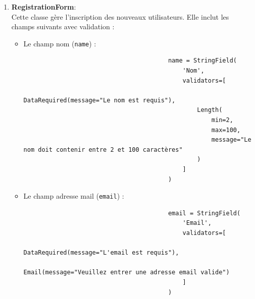 \documentclass[a4paper,11pt]{article}
\begin{document}
                \begin{enumerate}
                    \item \textbf{RegistrationForm}:\\
                        \noindent Cette classe gère l'inscription des nouveaux utilisateurs. Elle inclut les champs suivants avec validation :

                        \begin{itemize}
                            \item Le champ nom (\texttt{name}) :
                                \begin{tcolorbox}[colback=lightgray!6, colframe=black, left=-70mm, right=5mm, top=2mm, bottom=0mm, boxrule=0.1mm]
                                    \begin{verbatim}
                                        name = StringField(
                                            'Nom', 
                                            validators=[
                                                DataRequired(message="Le nom est requis"),
                                                Length(
                                                    min=2, 
                                                    max=100, 
                                                    message="Le nom doit contenir entre 2 et 100 caractères"
                                                )
                                            ]
                                        )
                                    \end{verbatim}
                                \end{tcolorbox}
                            \item Le champ adresse mail (\texttt{email}) :
                                \begin{tcolorbox}[colback=lightgray!6, colframe=black, left=-70mm, right=5mm, top=2mm, bottom=0mm, boxrule=0.1mm]
                                    \begin{verbatim}
                                        email = StringField(
                                            'Email', 
                                            validators=[
                                                DataRequired(message="L'email est requis"),
                                                Email(message="Veuillez entrer une adresse email valide")
                                            ]
                                        )
                                    \end{verbatim}

\end{tcolorbox}
\end{itemize}
\end{enumerate}
\end{document}
